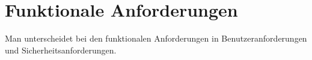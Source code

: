 \section{Funktionale Anforderungen}

Man unterscheidet bei den funktionalen Anforderungen in Benutzeranforderungen und Sicherheitsanforderungen.



